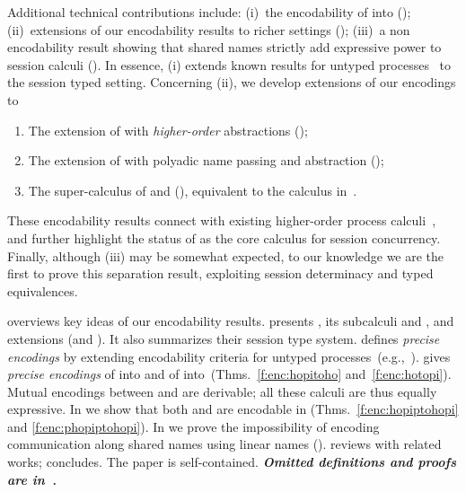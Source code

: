 Additional technical contributions include: 
(i)~the encodability of \HO into \sessp (); 
(ii)~extensions of our encodability results to richer settings ();
(iii)~a non encodability result showing that shared names strictly add expressive power to session calculi ().
In essence, (i) extends known  results for untyped processes~\cite{SangiorgiD:expmpa} to the session typed setting.
Concerning (ii), we develop extensions of our encodings to 
\begin{enumerate}[-]
\item The extension of \HOp with \emph{higher-order} abstractions (\HOpp); 
\item The extension of \HOp with polyadic name passing and abstraction (\pHOp); 
\item The super-calculus of \HOpp and \pHOp (\PHOpp), equivalent to the calculus in~\cite{tlca07}.
\end{enumerate}
These
encodability results connect \HOp with existing higher-order process calculi~\cite{tlca07}, and  
further highlight the status of \HO as the core calculus for session concurrency.
Finally, although (iii) may be somewhat expected, to our knowledge we are the first to prove this separation result, 
exploiting session determinacy and typed equivalences.




 overviews key ideas of our encodability results.
{} presents \HOp, its 
subcalculi \HO and \sessp, and extensions (\HOpp and \PHOp).  
It also summarizes their session type system.
 defines \emph{precise %
encodings} by extending encodability criteria 
 for
untyped processes~(e.g.,~\cite{DBLP:journals/iandc/Gorla10}).
{} %
gives \emph{precise encodings} of \HOp into \HO and of \HOp into~\sessp (Thms.~\ref{f:enc:hopitoho} and~\ref{f:enc:hotopi}).
Mutual encodings between \sessp and \HO are derivable; 
all these calculi are thus equally expressive.
In  %
we show that both \HOpp 
and \pHOp 
are encodable in \HOp
(Thms.~\ref{f:enc:hopiptohopi} and \ref{f:enc:phopiptohopi}).
In  we prove the impossibility of encoding communication along shared names
using linear names ().
{} reviews with related works;
 concludes.
The paper is self-contained. 
{\bf\em Omitted definitions and  proofs 
are in~\cite{KouzapasPY15}.} 


